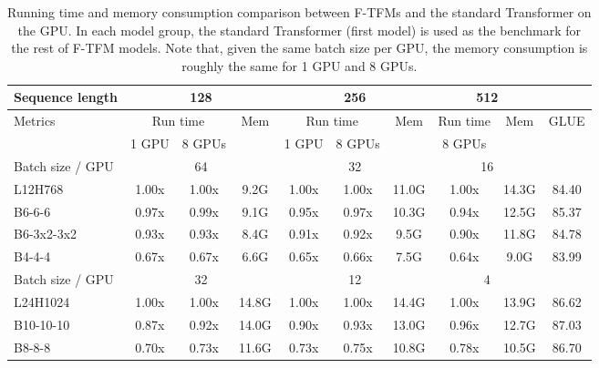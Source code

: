 \documentclass{article}
\theoremstyle{custom}
\begin{document}
\begin{table}[!ht]
	\small
	\centering
	\begin{tabular}{@{}l|cc|c|cc|c|c|c|c@{}}
		\toprule
		Sequence length & \multicolumn{3}{c|}{128} & \multicolumn{3}{c|}{256} & \multicolumn{2}{c|}{512} & \\
		\midrule
		\multirow{2}{*}{Metrics}
		& \multicolumn{2}{c|}{Run time} & \multirow{2}{*}{Mem} 
		& \multicolumn{2}{c|}{Run time} & \multirow{2}{*}{Mem} 
		& \multicolumn{1}{c|}{Run time} & \multirow{2}{*}{Mem} 
		& \multirow{2}{*}{GLUE} \\
		& 1 GPU & 8 GPUs &  & 1 GPU & 8 GPUs & & 8 GPUs & &  \\
		\midrule\midrule
		Batch size / GPU & \multicolumn{3}{c|}{64} & \multicolumn{3}{c|}{32} & \multicolumn{2}{c|}{16} & \\
		\cmidrule(r){1-1} \cmidrule(lr){2-4}\cmidrule(lr){5-7}\cmidrule(lr){8-9} \cmidrule(l){10-10}
		L12H768
		& 1.00x & 1.00x & 9.2G & 1.00x & 1.00x & 11.0G & 1.00x & 14.3G & 84.40 \\
		B6-6-6
		& 0.97x & 0.99x & 9.1G & 0.95x & 0.97x & 10.3G & 0.94x & 12.5G & 85.37 \\
		B6-3x2-3x2
		& 0.93x & 0.93x & 8.4G & 0.91x & 0.92x & 9.5G & 0.90x & 11.8G & 84.78 \\
		B4-4-4
		& 0.67x & 0.67x & 6.6G & 0.65x & 0.66x & 7.5G & 0.64x & 9.0G & 83.99 \\
		\midrule\midrule
		Batch size / GPU & \multicolumn{3}{c|}{32} & \multicolumn{3}{c|}{12} & \multicolumn{2}{c|}{4} & \\
		\cmidrule(r){1-1} \cmidrule(lr){2-4}\cmidrule(lr){5-7}\cmidrule(lr){8-9} \cmidrule(l){10-10}
		L24H1024
		& 1.00x & 1.00x & 14.8G & 1.00x & 1.00x & 14.4G & 1.00x & 13.9G & 86.62 \\
		B10-10-10
		& 0.87x & 0.92x & 14.0G & 0.90x & 0.93x & 13.0G & 0.96x & 12.7G & 87.03 \\
		B8-8-8
		& 0.70x & 0.73x & 11.6G & 0.73x & 0.75x & 10.8G & 0.78x & 10.5G & 86.70 \\
		\bottomrule
	\end{tabular}
	\caption{
		Running time and memory consumption comparison between F-TFMs and the standard Transformer on the GPU. 
		In each model group, the standard Transformer (first model) is used as the benchmark for the rest of F-TFM models.
		Note that, given the same batch size per GPU, the memory consumption is roughly the same for 1 GPU and 8 GPUs.
	}
	\label{tab:gpu-time}
\end{table}
\end{document}
